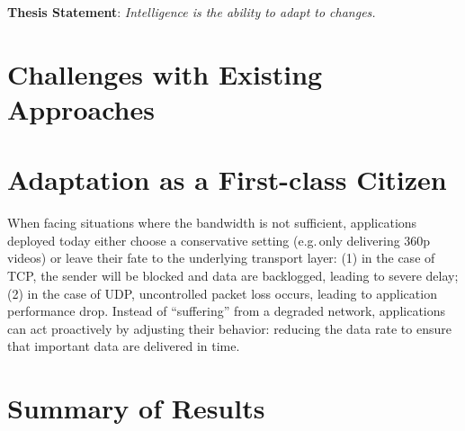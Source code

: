 \documentclass[thesis.tex]{subfiles}
\begin{document}
\noindent\textbf{Thesis Statement}: \textit{Intelligence is the ability to adapt to
  changes.}

\vspace{1em}

\section{Challenges with Existing Approaches}
\label{sec:chall-with-exist}





\section{Adaptation as a First-class Citizen}
\label{sec:adaptation}

When facing situations where the bandwidth is not sufficient, applications
deployed today either choose a conservative setting (e.g.\,only delivering 360p
videos) or leave their fate to the underlying transport layer: (1) in the case
of TCP, the sender will be blocked and data are backlogged, leading to severe
delay; (2) in the case of UDP, uncontrolled packet loss occurs, leading to
application performance drop. Instead of ``suffering'' from a degraded network,
applications can act proactively by adjusting their behavior: reducing the data
rate to ensure that important data are delivered in time.




\section{Summary of Results}
\label{sec:summary-results-1}
\end{document}
